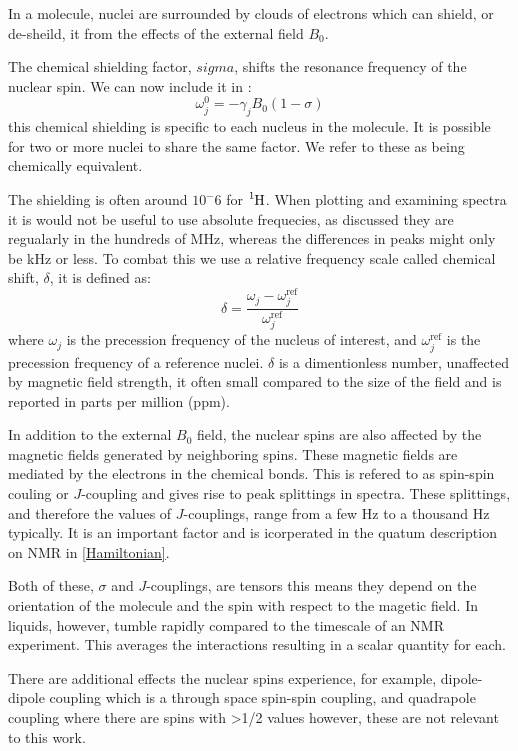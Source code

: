 In a molecule, nuclei are surrounded by clouds of electrons which can shield, or de-sheild, it
from the effects of the external field $B_0$.

The chemical shielding factor, $sigma$, shifts the resonance frequency of the nuclear spin. We
can now include it in :
\begin{equation}
  \omega_j^0 = -\gamma_jB_0(1-\sigma)
\end{equation}
this chemical shielding is specific to each nucleus in the molecule. It is possible
for two or more nuclei to share the same factor. We refer to these as being chemically equivalent.

The shielding is often around $10^-6$ for $\ce{^1H}$. When plotting and examining spectra
it is would not be useful to use absolute frequecies, as discussed they are regualarly in the hundreds of MHz,
whereas the differences in peaks might only be kHz or less. To combat this we use a relative frequency scale
called chemical shift, $\delta$, it is defined as:
\begin{equation}
  \delta = \frac{\omega_j-\omega^\text{ref}_j}{\omega^\text{ref}_j}
\end{equation}
where $\omega_j$ is the precession frequency of the nucleus of interest, and $\omega^\text{ref}_j$ is the precession
frequency of a reference nuclei. $\delta$ is a dimentionless number, unaffected by magnetic field strength, it often
small compared to the size of the field and is reported in parts per million (ppm).

In addition to the external $B_0$ field, the nuclear spins are also affected by the magnetic fields generated
by neighboring spins. These magnetic fields are mediated by the electrons in the chemical bonds. This is refered to as
spin-spin couling or $J$-coupling and gives rise to peak splittings in spectra. These splittings, and therefore the values of $J$-couplings, range from a few Hz to a thousand Hz typically. It is an important factor and is icorperated
in the quatum description on NMR in \ref{Hamiltonian}.

Both of these, $\sigma$ and $J$-couplings, are tensors this means they depend on the orientation of the molecule
and the spin with respect to the magetic field. In liquids, however, tumble rapidly compared to the timescale
of an NMR experiment. This averages the interactions resulting in a scalar quantity for each.

There are additional effects the nuclear spins experience, for example, dipole-dipole coupling which
is a through space spin-spin coupling, and quadrapole coupling where there are spins with >1/2 values
however, these are not relevant to this work.


